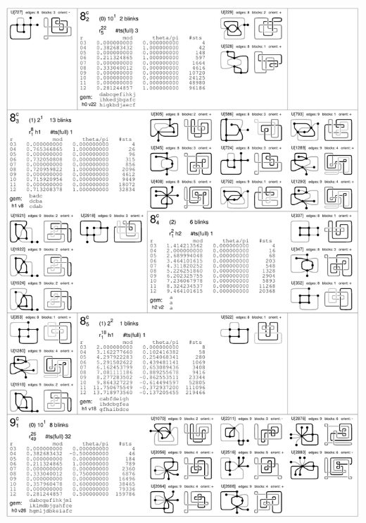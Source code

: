 \begin{center}
 \includegraphics[height=23.5cm]{E.figsbw2/compcatalog002_bw.pdf} \eject 

\end{center}
